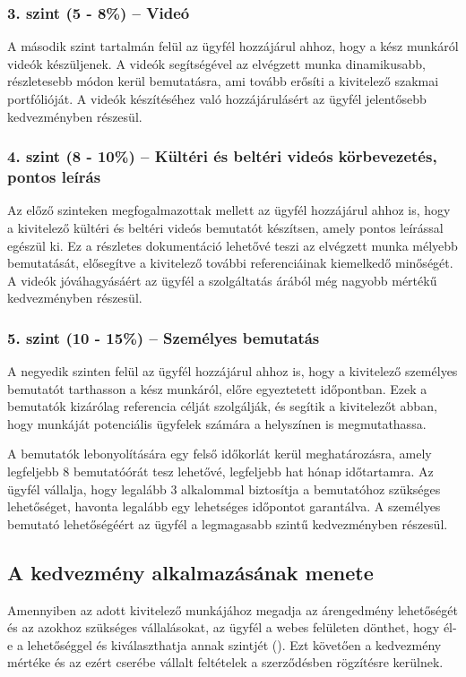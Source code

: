 \subsubsection{3. szint (5 - 8\%) – Videó} 
A második szint tartalmán felül az ügyfél hozzájárul ahhoz, hogy a kész munkáról videók készüljenek. A videók segítségével az elvégzett munka dinamikusabb, részletesebb módon kerül bemutatásra, ami tovább erősíti a kivitelező szakmai portfólióját. A videók készítéséhez való hozzájárulásért az ügyfél jelentősebb kedvezményben részesül.

\subsubsection{4. szint (8 - 10\%) – Kültéri és beltéri videós körbevezetés, pontos leírás} 
Az előző szinteken megfogalmazottak mellett az ügyfél hozzájárul ahhoz is, hogy a kivitelező kültéri és beltéri videós bemutatót készítsen, amely pontos leírással egészül ki. Ez a részletes dokumentáció lehetővé teszi az elvégzett munka mélyebb bemutatását, elősegítve a kivitelező további referenciáinak kiemelkedő minőségét. A videók jóváhagyásáért az ügyfél a szolgáltatás árából még nagyobb mértékű kedvezményben részesül.

\subsubsection{5. szint (10 - 15\%) – Személyes bemutatás} 
A negyedik szinten felül az ügyfél hozzájárul ahhoz is, hogy a kivitelező személyes bemutatót tarthasson a kész munkáról, előre egyeztetett időpontban. Ezek a bemutatók kizárólag referencia célját szolgálják, és segítik a kivitelezőt abban, hogy munkáját potenciális ügyfelek számára a helyszínen is megmutathassa.

A bemutatók lebonyolítására egy felső időkorlát kerül meghatározásra, amely legfeljebb 8 bemutatóórát tesz lehetővé, legfeljebb hat hónap időtartamra. Az ügyfél vállalja, hogy legalább 3 alkalommal biztosítja a bemutatóhoz szükséges lehetőséget, havonta legalább egy lehetséges időpontot garantálva. A személyes bemutató lehetőségéért az ügyfél a legmagasabb szintű kedvezményben részesül.

\subsection{A kedvezmény alkalmazásának menete}
Amennyiben az adott kivitelező munkájához megadja az árengedmény lehetőségét és az azokhoz szükséges vállalásokat,
az ügyfél a webes felületen dönthet, hogy él-e a lehetőséggel és kiválaszthatja annak szintjét ().
Ezt követően a kedvezmény mértéke és az ezért cserébe vállalt feltételek a szerződésben rögzítésre kerülnek.

